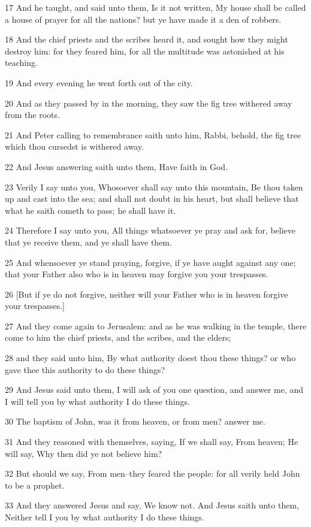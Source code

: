 \par 17 And he taught, and said unto them, Is it not written, My house shall be called a house of prayer for all the nations? but ye have made it a den of robbers.
\par 18 And the chief priests and the scribes heard it, and sought how they might destroy him: for they feared him, for all the multitude was astonished at his teaching.
\par 19 And every evening he went forth out of the city.
\par 20 And as they passed by in the morning, they saw the fig tree withered away from the roots.
\par 21 And Peter calling to remembrance saith unto him, Rabbi, behold, the fig tree which thou cursedst is withered away.
\par 22 And Jesus answering saith unto them, Have faith in God.
\par 23 Verily I say unto you, Whosoever shall say unto this mountain, Be thou taken up and cast into the sea; and shall not doubt in his heart, but shall believe that what he saith cometh to pass; he shall have it.
\par 24 Therefore I say unto you, All things whatsoever ye pray and ask for, believe that ye receive them, and ye shall have them.
\par 25 And whensoever ye stand praying, forgive, if ye have aught against any one; that your Father also who is in heaven may forgive you your trespasses.
\par 26 [But if ye do not forgive, neither will your Father who is in heaven forgive your trespasses.]
\par 27 And they come again to Jerusalem: and as he was walking in the temple, there come to him the chief priests, and the scribes, and the elders;
\par 28 and they said unto him, By what authority doest thou these things? or who gave thee this authority to do these things?
\par 29 And Jesus said unto them, I will ask of you one question, and answer me, and I will tell you by what authority I do these things.
\par 30 The baptism of John, was it from heaven, or from men? answer me.
\par 31 And they reasoned with themselves, saying, If we shall say, From heaven; He will say, Why then did ye not believe him?
\par 32 But should we say, From men--they feared the people: for all verily held John to be a prophet.
\par 33 And they answered Jesus and say, We know not. And Jesus saith unto them, Neither tell I you by what authority I do these things.

